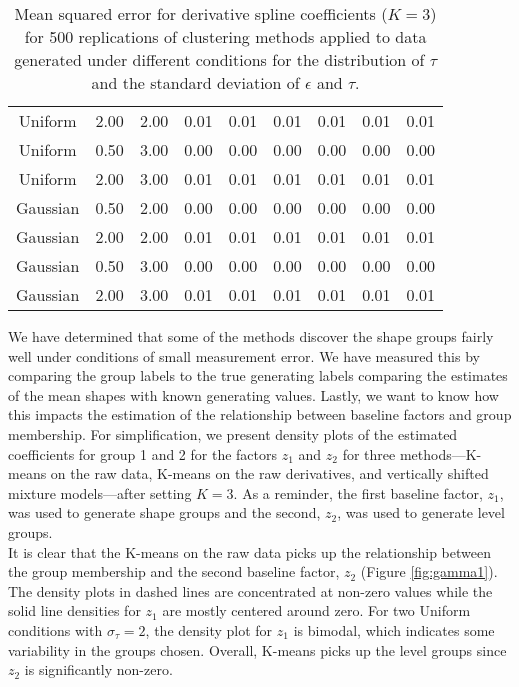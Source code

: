 \begin{table}[ht]
\begin{center}
\begin{tabular}{ccc|cccccc}
  Uniform & 2.00 & 2.00 & 0.01 & 0.01 & 0.01 & 0.01 & 0.01 & 0.01 \\ 
  Uniform & 0.50 & 3.00 & 0.00 & 0.00 & 0.00 & 0.00 & 0.00 & 0.00 \\ 
  Uniform & 2.00 & 3.00 & 0.01 & 0.01 & 0.01 & 0.01 & 0.01 & 0.01 \\ 
  Gaussian & 0.50 & 2.00 & 0.00 & 0.00 & 0.00 & 0.00 & 0.00 & 0.00 \\ 
  Gaussian & 2.00 & 2.00 & 0.01 & 0.01 & 0.01 & 0.01 & 0.01 & 0.01 \\ 
  Gaussian & 0.50 & 3.00 & 0.00 & 0.00 & 0.00 & 0.00 & 0.00 & 0.00 \\ 
  Gaussian & 2.00 & 3.00 & 0.01 & 0.01 & 0.01 & 0.01 & 0.01 & 0.01 \\ 
   \hline\end{tabular}
\caption{Mean squared error for derivative spline coefficients ($K=3$) for 500 replications of clustering methods applied to data generated under different conditions for the distribution of $\tau$ and the standard deviation of $\epsilon$ and $\tau$.}
\label{tab:mse3}
\end{center}
\end{table}

We have determined that some of the methods discover the shape groups fairly well under conditions of small measurement error. We have measured this by comparing the group labels to the true generating labels comparing the estimates of the mean shapes with known generating values. Lastly, we want to know how this impacts the estimation of the relationship between baseline factors and group membership. For simplification, we present density plots of the estimated coefficients for group 1 and 2 for the factors $z_{1}$ and $z_{2}$ for three methods---K-means on the raw data, K-means on the raw derivatives, and vertically shifted mixture models---after setting $K=3$. As a reminder, the first baseline factor, $z_{1}$, was used to generate shape groups and the second, $z_{2}$, was used to generate level groups. \\

It is clear that the K-means on the raw data picks up the relationship between the group membership and the second baseline factor, $z_{2}$ (Figure \ref{fig:gamma1}). The density plots in dashed lines are concentrated at non-zero values while the solid line densities for $z_{1}$ are mostly centered around zero. For two Uniform conditions with $\sigma_{\tau}=2$, the density plot for $z_{1}$ is bimodal, which indicates some variability in the groups chosen. Overall, K-means picks up the level groups since $z_{2}$ is significantly non-zero.\\

